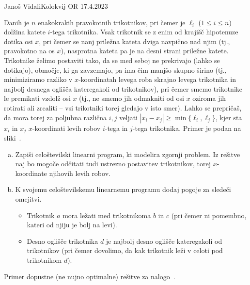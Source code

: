 \begin{naloga}{Janoš Vidali}{Kolokvij OR 17.4.2023}
\begin{vprasanje}
Danih je $n$ enakokrakih pravokotnih trikotnikov,
pri čemer je $\ell_i$ ($1 \le i \le n$) dolžina katete $i$-tega trikotnika.
Vsak trikotnik se z enim od krajišč hipotenuze dotika osi $x$,
pri čemer se nanj priležna kateta dviga navpično nad njim
(tj., pravokotno na os $x$),
nasprotna kateta pa je na desni strani priležne katete.
Trikotnike želimo postaviti tako,
da se med seboj ne prekrivajo (lahko se dotikajo),
območje, ki ga zavzemajo, pa ima čim manjšo skupno širino
(tj., minimiziramo razliko v $x$-koordinatah levega roba skrajno levega trikotnika
in najbolj desnega oglišča kateregakoli od trikotnikov),
pri čemer smemo trikotnike le premikati vzdolž osi $x$
(tj., ne smemo jih odmakniti od osi $x$ oziroma jih rotirati ali zrcaliti
-- vsi trikotniki torej gledajo v isto smer).
Lahko se prepričaš, da mora torej za poljubna različna $i, j$
veljati $|x_i - x_j| \ge \min\{\ell_i, \ell_j\}$,
kjer sta $x_i$ in $x_j$ $x$-koordinati
levih robov $i$-tega in $j$-tega trikotnika.
Primer je podan na sliki~\fig.

\begin{enumerate}[(a)]
\item Zapiši celoštevilski linearni program, ki modelira zgornji problem.
Iz rešitve naj bo mogoče odčitati tudi ustrezno postavitev trikotnikov,
torej $x$-koordinate njihovih levih robov.

\item K svojemu celoštevilskemu linearnemu programu dodaj pogoje za sledeči omejitvi.
\begin{itemize}
\item Trikotnik $a$ mora ležati med trikotnikoma $b$ in $c$
(pri čemer ni pomembno, kateri od njiju je bolj na levi).
\item Desno oglišče trikotnika $d$ je najbolj desno oglišče
kateregakoli od tri\-kot\-ni\-kov
(pri čemer dovolimo, da kak trikotnik leži v celoti pod trikotnikom $d$).
\end{itemize}
\end{enumerate}

\begin{slika}
\pgfslika
\caption{Primer dopustne (ne nujno optimalne) rešitve za nalogo~\nal.}
\end{slika}
\end{vprasanje}


\end{naloga}
